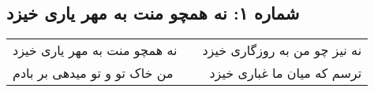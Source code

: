 \begin{center}
\section*{شماره ۱: نه همچو منت به مهر یاری خیزد}
\label{sec:001}
\begin{longtable}{l p{0.5cm} r}
نه همچو منت به مهر یاری خیزد
&&
نه نیز چو من به روزگاری خیزد
\\
من خاک تو و تو میدهی بر بادم
&&
ترسم که میان ما غباری خیزد
\\
\end{longtable}
\end{center}
